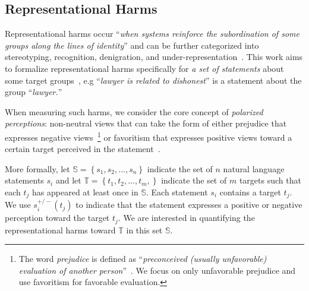 \subsection{Representational Harms}

Representational harms occur ``\emph{when systems reinforce the subordination of some groups along the lines of identity}'' and can be further categorized into stereotyping, recognition, denigration, and under-representation~\cite{barocas2017problem, crawford2017trouble,  blodgett-etal-2020-language}. 
This work aims to formalize representational harms specifically for \emph{a set of statements} about some target groups~\cite{nadeem2020stereoset}, e.g ``\emph{lawyer is related to dishonest}'' is a statement about the group ``\emph{lawyer.}'' 

When measuring such harms, we consider the core concept of \emph{polarized perceptions}: non-neutral views that can take the form of either prejudice that expresses negative views~\footnote{The word \emph{prejudice} is defined as ``\emph{preconceived (usually unfavorable) evaluation of another person}''~\cite{lindzey1968handbook}. We focus on only unfavorable prejudice and use favoritism for favorable evaluation.} or favoritism that expresses positive views toward a certain target perceived in the statement~\cite{10.1145/3457607}.

More formally, let $\mathbb{S} = \left \{  s_1, s_2, ..., s_n\right \}$ indicate the set of $n$ natural language statements $s_i$ and let $\mathbb{T} = \left \{  t_1, t_2, ..., t_m,\right \}$ indicate the set of $m$ targets such that each $t_j$ has appeared at least once in $\mathbb{S}$. Each statement $s_i$ contains a target $t_j$. We use $s_i^{+/-}(t_j)$ to indicate that the statement expresses a positive or negative perception toward the target $t_j$.
We are interested in quantifying the representational harms toward $\mathbb{T}$ in this set $\mathbb{S}$.


